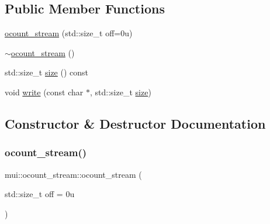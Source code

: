 \subsection*{Public Member Functions}
\begin{DoxyCompactItemize}
\item 
\hyperlink{classmui_1_1ocount__stream_ab156198b5e8f4abddbcd284ad30f2a17}{ocount\+\_\+stream} (std\+::size\+\_\+t off=0u)
\item 
\hyperlink{classmui_1_1ocount__stream_a036bf20fdc27902a7a4770f576a90f77}{$\sim$ocount\+\_\+stream} ()
\item 
std\+::size\+\_\+t \hyperlink{classmui_1_1ocount__stream_a02a11f05e4411c05516e4bc2ec705128}{size} () const
\item 
void \hyperlink{classmui_1_1ocount__stream_a7d536099a215a5546eef065634b7ea67}{write} (const char $\ast$, std\+::size\+\_\+t \hyperlink{classmui_1_1ocount__stream_a02a11f05e4411c05516e4bc2ec705128}{size})
\end{DoxyCompactItemize}


\subsection{Constructor \& Destructor Documentation}
\mbox{\label{classmui_1_1ocount__stream_ab156198b5e8f4abddbcd284ad30f2a17}} 
\subsubsection{\texorpdfstring{ocount\+\_\+stream()}{ocount\_stream()}}
{\footnotesize\ttfamily mui\+::ocount\+\_\+stream\+::ocount\+\_\+stream (\begin{DoxyParamCaption}\item[{std\+::size\+\_\+t}]{off = {\ttfamily 0u} }\end{DoxyParamCaption})\hspace{0.3cm}{\ttfamily [inline]}}

\mbox{\label{classmui_1_1ocount__stream_a036bf20fdc27902a7a4770f576a90f77}} 

